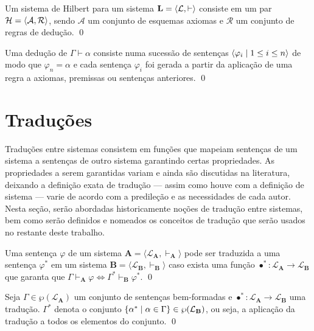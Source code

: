 \begin{definition}[Axiomatização]
    Um sistema de Hilbert para um sistema $\mathbf{L} = \langle\mathcal{L}, \vdash\rangle$ consiste em um par $\mathcal{H} = \langle\mathcal{A}, \mathcal{R}\rangle$, sendo $\mathcal{A}$ um conjunto de esquemas axiomas e $\mathcal{R}$ um conjunto de regras de dedução.
    \qed{}
\end{definition}

\begin{definition}[Dedução]
    Uma dedução de $\Gamma\vdash\alpha$ consiste numa sucessão de sentenças $\langle\varphi_i\mid 1 \leq i\leq n\rangle$ de modo que $\varphi_n=\alpha$ e cada sentença $\varphi_i$ foi gerada a partir da aplicação de uma regra a axiomas, premissas ou sentenças anteriores.
    \qed{}
\end{definition}

\section{Traduções}

Traduções entre sistemas consistem em funções que mapeiam sentenças de um sistema a sentenças de outro sistema garantindo certas propriedades. As propriedades a serem garantidas variam e ainda são discutidas na literatura, deixando a definição exata de tradução --- assim como houve com a definição de sistema --- varie de acordo com a predileção e as necessidades de cada autor. Nesta seção, serão abordadas historicamente noções de tradução entre sistemas, bem como serão definidos e nomeados os conceitos de tradução que serão usados no restante deste trabalho.

\begin{definition}[Tradução] 
    Uma sentença $\varphi$ de um sistema $\mathbf{A} = \langle \mathcal{L}_\mathbf{A}, \vdash_\mathbf{A}\rangle$ pode ser traduzida a uma sentença $\varphi^*$ em um sistema $\mathbf{B} = \langle \mathcal{L}_\mathbf{B}, \vdash_\mathbf{B} \rangle$ caso exista uma função $\bullet^* : \mathcal{L}_\mathbf{A} \to \mathcal{L}_\mathbf{B}$ que garanta que $\Gamma \vdash_\mathbf{A} \varphi \Leftrightarrow \Gamma^* \vdash_\mathbf{B} \varphi^*$.
    \qed{}
\end{definition}

\begin{notation}
    Seja $\Gamma\in\wp(\mathcal{L}_\mathbf{A})$ um conjunto de sentenças bem-formadas e $\bullet^*\mathrel{:}\mathcal{L}_\mathbf{A}\to\mathcal{L}_\mathbf{B}$ uma tradução. $\Gamma^*$ denota o conjunto $\left\{\alpha^*\mid\alpha\in\Gamma\right\}\in\wp(\mathcal{L}_\mathbf{B})$, ou seja, a aplicação da tradução a todos os elementos do conjunto.
    \qed{}
\end{notation}

